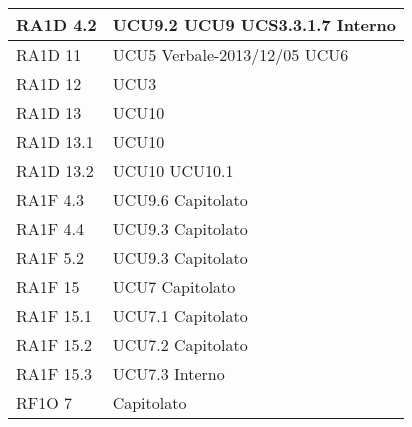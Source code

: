 \begin{center}
\begin{longtable}{ | p{5cm} | p{5cm} |}
        RA1D 4.2  &  UCU9.2 \newline  UCU9 \newline  UCS3.3.1.7 \newline  Interno \newline  \\ \hline      
        RA1D 11 &  UCU5 \newline  Verbale-2013/12/05 \newline  UCU6 \newline  \\ \hline      
        RA1D 12 &  UCU3 \newline  \\ \hline      
        RA1D 13 &  UCU10 \newline  \\ \hline      
        RA1D 13.1 &  UCU10 \newline  \\ \hline      
        RA1D 13.2 &  UCU10 \newline  UCU10.1 \newline  \\ \hline      
        RA1F 4.3 &  UCU9.6 \newline  Capitolato \newline  \\ \hline      
        RA1F 4.4 &  UCU9.3 \newline  Capitolato \newline  \\ \hline      
        RA1F 5.2 &  UCU9.3 \newline  Capitolato \newline  \\ \hline      
        RA1F 15 &  UCU7 \newline  Capitolato \newline  \\ \hline      
        RA1F 15.1 &  UCU7.1 \newline  Capitolato \newline  \\ \hline      
        RA1F 15.2 &  UCU7.2 \newline  Capitolato \newline  \\ \hline      
        RA1F 15.3 &  UCU7.3 \newline  Interno \newline  \\ \hline      
        RF1O 7 &  Capitolato \newline  \\ \hline      

\end{longtable}
\end{center}
